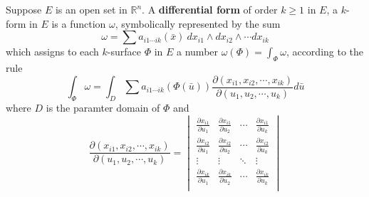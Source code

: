 \begin{definition}
	Suppose $E$ is an open set in $\mathbb{R}^n$.
	A \textbf{differential form} of order $k \ge 1$ in $E$, a $k$-form in $E$ is a function $\omega$,
	symbolically represented by the sum
	\begin{equation} \omega = \sum a_{i1\cdots ik}(\bar{x})\ dx_{i1}\wedge dx_{i2} \wedge \cdots dx_{ik}
	\end{equation}
	which assigns to each $k$-surface $\Phi$ in $E$ a number $\omega(\Phi) = \int_{\Phi} \omega $,
	according to the rule
	\begin{equation}
		\int_{\Phi} \omega = \int_D \sum a_{i1\cdots ik}(\Phi(\bar{u})) \frac{\partial(x_{i1},x_{i2},\cdots,x_{ik})}{\partial(u_1,u_2,\cdots,u_k)}d\bar{u}
	\end{equation}
	where $D$ is the paramter domain of $\Phi$ and
	\begin{equation}
	\frac{\partial(x_{i1},x_{i2},\cdots,x_{ik})}{\partial(u_1,u_2,\cdots,u_k)} = \begin{vmatrix}
		\frac{\partial x_{i1}}{\partial u_1} & \frac{\partial x_{i1}}{\partial u_2} & \cdots & \frac{\partial x_{i1}}{\partial u_k} \\
		\frac{\partial x_{i2}}{\partial u_1} & \frac{\partial x_{i2}}{\partial u_2} & \cdots & \frac{\partial x_{i2}}{\partial u_k} \\
		\vdots & \vdots & \ddots & \vdots \\
		\frac{\partial x_{ik}}{\partial u_1} & \frac{\partial x_{ik}}{\partial u_2} & \cdots & \frac{\partial x_{ik}}{\partial u_k} \\
	\end{vmatrix}
	\end{equation}
\end{definition}
